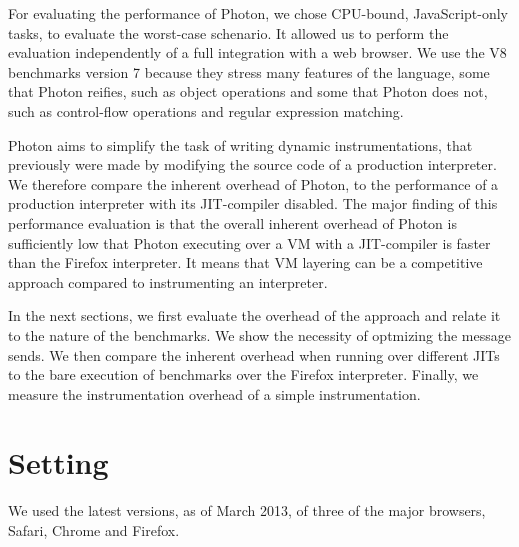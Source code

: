 For evaluating the performance of Photon, we chose CPU-bound, JavaScript-only
tasks, to evaluate the worst-case schenario. It allowed us to perform the
evaluation independently of a full integration with a web browser. We use the
V8 benchmarks version 7 because they stress many features of the language, some that
Photon reifies, such as object operations and some that Photon does not, such
as control-flow operations and regular expression matching.

Photon aims to simplify the task of writing dynamic instrumentations, that
previously were made by modifying the source code of a production interpreter.
We therefore compare the inherent overhead of Photon, to the performance of a
production interpreter with its JIT-compiler disabled. The major finding of
this performance evaluation is that the overall inherent overhead of Photon is
sufficiently low that Photon executing over a VM with a JIT-compiler is faster
than the Firefox interpreter.  It means that VM layering can be a competitive
approach compared to instrumenting an interpreter.

In the next sections, we first evaluate the overhead of the approach and relate
it to the nature of the benchmarks. We show the necessity of optmizing the
message sends. We then compare the inherent overhead when running over
different JITs to the bare execution of benchmarks over the Firefox
interpreter. Finally, we measure the instrumentation overhead of a simple
instrumentation.

\section{Setting}

We used the latest versions, as of March 2013, of three of the major browsers,
Safari, Chrome and Firefox.

